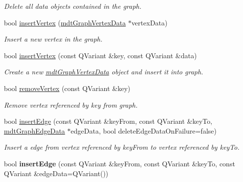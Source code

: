 \begin{DoxyCompactItemize}
\begin{DoxyCompactList}\small\item\em Delete all data objects contained in the graph. \end{DoxyCompactList}\item 
bool \hyperlink{classmdt_graph_a9f89cb73ae73446fe422cbd7e4dfebe8}{insertVertex} (\hyperlink{classmdt_graph_vertex_data}{mdtGraphVertexData} $\ast$vertexData)
\begin{DoxyCompactList}\small\item\em Insert a new vertex in the graph. \end{DoxyCompactList}\item 
bool \hyperlink{classmdt_graph_ad4e3eb699e8bed5e638662b26c55f3f5}{insertVertex} (const QVariant \&key, const QVariant \&data)
\begin{DoxyCompactList}\small\item\em Create a new \hyperlink{classmdt_graph_vertex_data}{mdtGraphVertexData} object and insert it into graph. \end{DoxyCompactList}\item 
bool \hyperlink{classmdt_graph_a39765644965163865e29adcd55091758}{removeVertex} (const QVariant \&key)
\begin{DoxyCompactList}\small\item\em Remove vertex referenced by key from graph. \end{DoxyCompactList}\item 
bool \hyperlink{classmdt_graph_a120f9aac9d98e512d51249758d8eae8c}{insertEdge} (const QVariant \&keyFrom, const QVariant \&keyTo, \hyperlink{classmdt_graph_edge_data}{mdtGraphEdgeData} $\ast$edgeData, bool deleteEdgeDataOnFailure=false)
\begin{DoxyCompactList}\small\item\em Insert a edge from vertex referenced by keyFrom to vertex referenced by keyTo. \end{DoxyCompactList}\item 
\hypertarget{classmdt_graph_a1268b743339d0e2c412d738397085d08}{
bool {\bfseries insertEdge} (const QVariant \&keyFrom, const QVariant \&keyTo, const QVariant \&edgeData=QVariant())}
\label{classmdt_graph_a1268b743339d0e2c412d738397085d08}


\end{DoxyCompactItemize}
